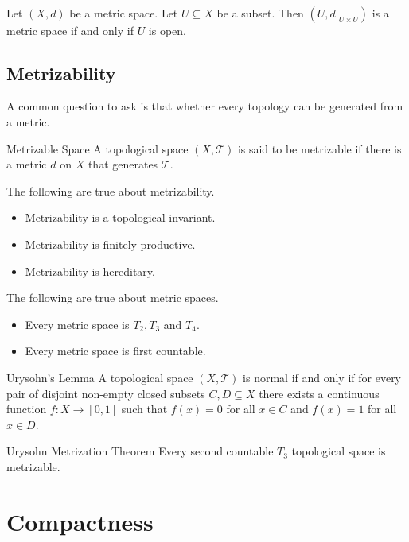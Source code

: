 \documentclass[a4paper]{article}
\begin{document}
\begin{prp}{}{}\\
Let $(X,d)$ be a metric space. Let $U\subseteq X$ be a subset. Then $(U,d|_{U\times U})$ is a metric space if and only if $U$ is open. 
\end{prp}

\subsection{Metrizability}
A common question to ask is that whether every topology can be generated from a metric. 
\begin{defn}{Metrizable Space}{} A topological space $(X,\mathcal{T})$ is said to be metrizable if there is a metric $d$ on $X$ that generates $\mathcal{T}$. 
\end{defn}

\begin{prp}{}{} The following are true about metrizability. 
\begin{itemize}
\item Metrizability is a topological invariant. 
\item Metrizability is finitely productive. 
\item Metrizability is hereditary. 
\end{itemize}
\end{prp}

\begin{prp}{}{} The following are true about metric spaces. 
\begin{itemize}
\item Every metric space is $T_2,T_3$ and $T_4$. 
\item Every metric space is first countable. 
\end{itemize}
\end{prp}

\begin{thm}{Urysohn's Lemma}{} A topological space $(X,\mathcal{T})$ is normal if and only if for every pair of disjoint non-empty closed subsets $C,D\subseteq X$ there exists a continuous function $f:X\to[0,1]$ such that $f(x)=0$ for all $x\in C$ and $f(x)=1$ for all $x\in D$. 
\end{thm}

\begin{thm}{Urysohn Metrization Theorem}{} Every second countable $T_3$ topological space is metrizable. 
\end{thm}

\pagebreak
\section{Compactness}
\end{document}
